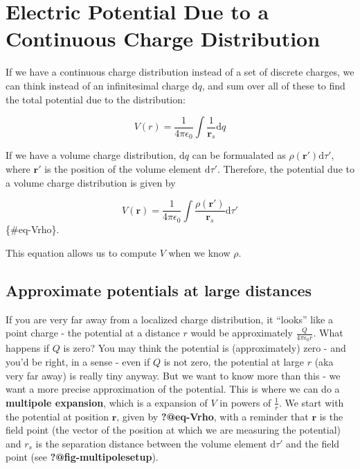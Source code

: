 \documentclass[
  letterpaper,
  DIV=11,
  numbers=noendperiod]{scrreprt}
\begin{document}
\section{Electric Potential Due to a Continuous Charge
Distribution}\label{electric-potential-due-to-a-continuous-charge-distribution}

If we have a continuous charge distribution instead of a set of discrete
charges, we can think instead of an infinitesimal charge
\(\mathrm{d}q\), and sum over all of these to find the total potential
due to the distribution:

\[ V(r) = \frac{1}{4\pi \epsilon_0} \int \frac{1}{\mathrm{\mathbf{r}}_s} \mathrm{d}q \]

If we have a volume charge distribution, \(\mathrm{d}q\) can be
formualated as \(\rho(\mathrm{\mathbf{r}}') \mathrm{d}\tau'\), where
\(\mathrm{\mathbf{r}}'\) is the position of the volume element
\(\mathrm{d}\tau'\). Therefore, the potential due to a volume charge
distribution is given by

\[ V(\mathrm{\mathbf{r}}) = \frac{1}{4\pi \epsilon_0} \int \frac{\rho(\mathrm{\mathbf{r}}')}{\mathrm{\mathbf{r}}_s} \mathrm{d} \tau' \]\{\#eq-Vrho\}.

This equation allows us to compute \(V\) when we know \(\rho\).

\subsection{Approximate potentials at large
distances}\label{approximate-potentials-at-large-distances}

If you are very far away from a localized charge distribution, it
``looks'' like a point charge - the potential at a distance \(r\) would
be approximately \(\frac{Q}{4\pi\epsilon_0 r}\). What happens if \(Q\)
is zero? You may think the potential is (approximately) zero - and you'd
be right, in a sense - even if \(Q\) is not zero, the potential at large
\(r\) (aka very far away) is really tiny anyway. But we want to know
more than this - we want a more precise approximation of the potential.
This is where we can do a \textbf{multipole expansion}, which is a
expansion of \(V\) in powers of \(\frac{1}{r}\). We start with the
potential at position \(\mathrm{\mathbf{r}}\), given by
\textbf{?@eq-Vrho}, with a reminder that \(\mathrm{\mathbf{r}}\) is the
field point (the vector of the position at which we are measuring the
potential) and \(r_s\) is the separation distance between the volume
element \(\mathrm{d}\tau'\) and the field point (see
\textbf{?@fig-multipolesetup}).
\end{document}
